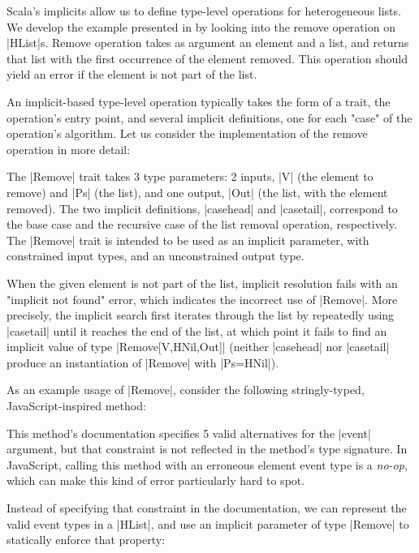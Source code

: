 Scala's implicits allow us to define type-level operations for heterogeneous lists.
We develop the example presented in  by looking into the remove operation on |HList|s.
Remove operation takes as argument an element and a list, and returns that list with the first occurrence of the element removed.
This operation should yield an error if the element is not part of the list.

An implicit-based type-level operation typically takes the form of a trait, the operation's entry point, and several implicit definitions, one for each "case" of the operation's algorithm.
Let us consider the implementation of the remove operation in more detail:

\memImplicitRemove

\noindent
The |Remove| trait takes 3 type parameters: 2 inputs, |V| (the element to remove) and |Ps| (the list), and one output, |Out| (the list, with the element removed).
The two implicit definitions, |casehead| and |casetail|, correspond to the base case and the recursive case of the list removal operation, respectively.
The |Remove| trait is intended to be used as an implicit parameter, with constrained input types, and an unconstrained output type.

When the given element is not part of the list, implicit resolution fails with an "implicit not found" error, which indicates the incorrect use of |Remove|.
More precisely, the implicit search first iterates through the list by repeatedly using |casetail| until it reaches the end of the list, at which point it fails to find an implicit value of type |Remove[V,HNil,Out]| (neither |casehead| nor |casetail| produce an instantiation of |Remove| with |Ps=HNil|).

As an example usage of |Remove|, consider the following stringly-typed, JavaScript-inspired method:

\addEventListenerJS

\noindent
This method's documentation specifies 5 valid alternatives for the |event| argument, but that constraint is not reflected in the method's type signature.
In JavaScript, calling this method with an erroneous element event type is a \emph{no-op}, which can make this kind of error particularly hard to spot.

Instead of specifying that constraint in the documentation, we can represent the valid event types in a |HList|, and use an implicit parameter of type |Remove| to statically enforce that property:

